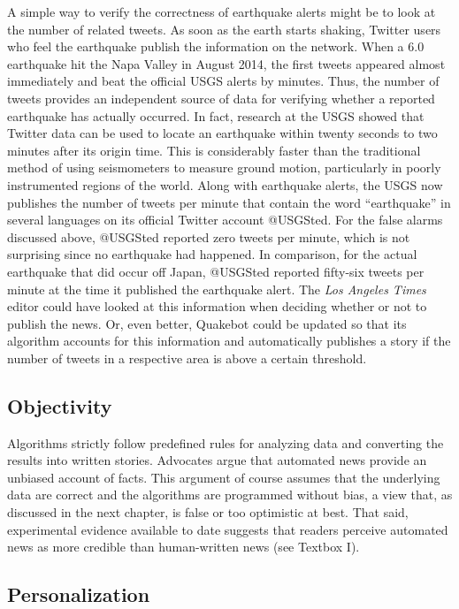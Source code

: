 \documentclass[notoc, symmetric, nobib, nols]{towcenter-book}
\begin{document}
A simple way to verify the correctness of earthquake alerts might be to look at the number of related tweets. As soon as the earth starts shaking, Twitter users who feel the earthquake publish the information on the network. When a 6.0 earthquake hit the Napa Valley in August 2014, the first tweets appeared almost immediately and beat the official USGS alerts by minutes. Thus, the number of tweets provides an independent source of data for verifying whether a reported earthquake has actually occurred. In fact, research at the USGS showed that Twitter data can be used to locate an earthquake within twenty seconds to two minutes after its origin time. This is considerably faster than the traditional method of using seismometers to measure ground motion, particularly in poorly instrumented regions of the world.\cite{earle11} Along with earthquake alerts, the USGS now publishes the number of tweets per minute that contain the word ``earthquake'' in several languages on its official Twitter account @USGSted. For the false alarms discussed above, @USGSted reported zero tweets per minute, which is not surprising since no earthquake had happened. In comparison, for the actual earthquake that did occur off Japan, @USGSted reported fifty-six tweets per minute at the time it published the earthquake alert. The \textit{Los Angeles Times} editor could have looked at this information when deciding whether or not to publish the news. Or, even better, Quakebot could be updated so that its algorithm accounts for this information and automatically publishes a story if the number of tweets in a respective area is above a certain threshold.

\subsection{Objectivity}

Algorithms strictly follow predefined rules for analyzing data and converting the results into written stories. Advocates argue that automated news provide an unbiased account of facts. This argument of course assumes that the underlying data are correct and the algorithms are programmed without bias, a view that, as discussed in the next chapter, is false or too optimistic at best.\cite{lazer14} That said, experimental evidence available to date suggests that readers perceive automated news as more credible than human-written news (see Textbox I).

\subsection{Personalization}
\end{document}
